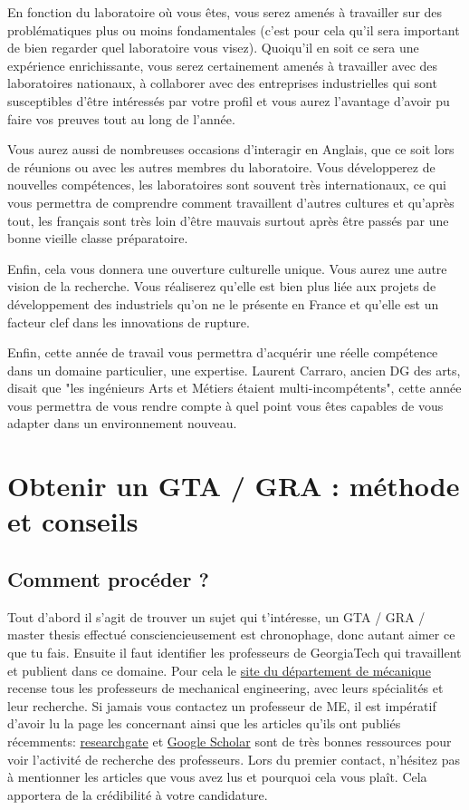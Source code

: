 \documentclass{article}
\begin{document}
En fonction du laboratoire où vous êtes, vous serez amenés à travailler sur des problématiques plus ou moins fondamentales (c'est pour cela qu'il sera important de bien regarder quel laboratoire vous visez). Quoiqu'il en soit ce sera une expérience enrichissante, vous serez certainement amenés à travailler avec des laboratoires nationaux, à collaborer avec des entreprises industrielles qui sont susceptibles d'être intéressés par votre profil et vous aurez l'avantage d'avoir pu faire vos preuves tout au long de l'année.

Vous aurez aussi de nombreuses occasions d'interagir en Anglais, que ce soit lors de réunions ou avec les autres membres du laboratoire. Vous développerez de nouvelles compétences, les laboratoires sont souvent très internationaux, ce qui vous permettra de comprendre comment travaillent d'autres cultures et qu'après tout, les français sont très loin d'être mauvais surtout après être passés par une bonne vieille classe préparatoire. 

Enfin, cela vous donnera une ouverture culturelle unique. Vous aurez une autre vision de la recherche. Vous réaliserez qu'elle est bien plus liée aux projets de développement des industriels qu'on ne le présente en France et qu'elle est un facteur clef dans les innovations de rupture.

Enfin, cette année de travail vous permettra d'acquérir une réelle compétence dans un domaine particulier, une expertise. Laurent Carraro, ancien DG des arts,  disait que "les ingénieurs Arts et Métiers étaient multi-incompétents", cette année vous permettra de vous rendre compte à quel point vous êtes capables de vous adapter dans un environnement nouveau. 




\section{Obtenir un GTA / GRA : méthode et conseils}

\subsection{Comment procéder ? }

Tout d'abord il s'agit de trouver un sujet qui t'intéresse, un GTA / GRA / master thesis effectué consciencieusement est chronophage, donc autant aimer ce que tu fais. Ensuite il faut identifier les professeurs de GeorgiaTech qui travaillent et publient dans ce domaine. Pour cela le  \href{https://www.me.gatech.edu/faculty}{site du département de mécanique} recense tous les professeurs de mechanical engineering, avec leurs spécialités et leur recherche. 
Si jamais vous contactez un professeur de ME, il est impératif d'avoir lu la page les concernant ainsi que les articles qu'ils ont publiés récemments: \href{https://www.researchgate.net}{researchgate} et \href{https://scholar.google.fr/}{Google Scholar} sont de très bonnes ressources pour voir l'activité de recherche des professeurs. Lors du premier contact, n'hésitez pas à mentionner les articles que vous avez lus et pourquoi cela vous plaît. Cela apportera de la crédibilité à votre candidature. 
\end{document}
